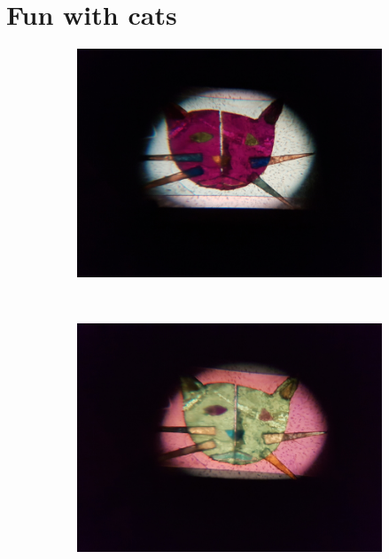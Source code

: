 \chapter{Fun with cats}
\begin{figure}[tb]
	\begin{subfigure}{.3\textwidth}
		\centering
		\includegraphics[height=.8\linewidth]{./img/cat1.jpg}
		\label{subfig:cata}
	\end{subfigure}
	$\quad$
	\begin{subfigure}{.3\textwidth}
		\centering
		\includegraphics[height=.8\linewidth]{./img/cat2.jpg}

\end{subfigure}
\end{figure}
